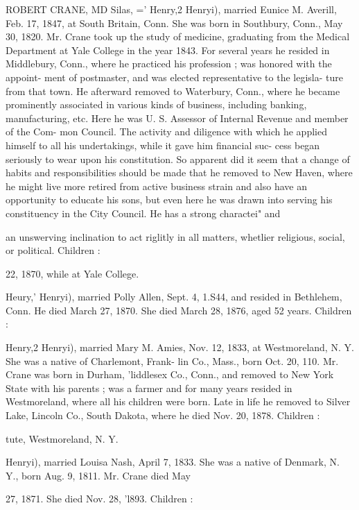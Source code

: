 \documentclass[oneside]{book}
\begin{document}
ROBERT CRANE, MD Silas, =' Henry,2 Henryi), married Eunice M. Averill, Feb. 17, 
1847, at South Britain, Conn. She was born in Southbury, 
Conn., May 30, 1820. Mr. Crane took up the study of medicine, 
graduating from the Medical Department at Yale College in the 
year 1843. For several years he resided in Middlebury, Conn., 
where he practiced his profession ; was honored with the appoint- 
ment of postmaster, and was elected representative to the legisla- 
ture from that town. He afterward removed to Waterbury, 
Conn., where he became prominently associated in various kinds 
of business, including banking, manufacturing, etc. Here he 
was U. S. Assessor of Internal Revenue and member of the Com- 
mon Council. The activity and diligence with which he applied 
himself to all his undertakings, while it gave him financial suc- 
cess began seriously to wear upon his constitution. So apparent 
did it seem that a change of habits and responsibilities should be 
made that he removed to New Haven, where he might live more 
retired from active business strain and also have an opportunity 
to educate his sons, but even here he was drawn into serving his 
constituency in the City Council. He has a strong charactei" and 




an unswerving inclination to act riglitly in all matters, whetlier 
religious, social, or political. Children : 



22, 1870, while at Yale College. 

Heury,' Henryi), married Polly Allen, Sept. 4, 1.S44, and resided 
in Bethlehem, Conn. He died March 27, 1870. She died March 
28, 1876, aged 52 years. Children : 


Henry,2 Henryi), married Mary M. Amies, Nov. 12, 1833, at 
Westmoreland, N. Y. She was a native of Charlemont, Frank- 
lin Co., Mass., born Oct. 20, 110. Mr. Crane was born in 
Durham, 'liddlesex Co., Conn., and removed to New York State 
with his parents ; was a farmer and for many years resided in 
Westmoreland, where all his children were born. Late in life he 
removed to Silver Lake, Lincoln Co., South Dakota, where he 
died Nov. 20, 1878. Children : 


tute, Westmoreland, N. Y. 



Henryi), married Louisa Nash, April 7, 1833. She was a native 
of Denmark, N. Y., born Aug. 9, 1811. Mr. Crane died May 

27, 1871. She died Nov. 28, 'l893. Children : 
\end{document}
